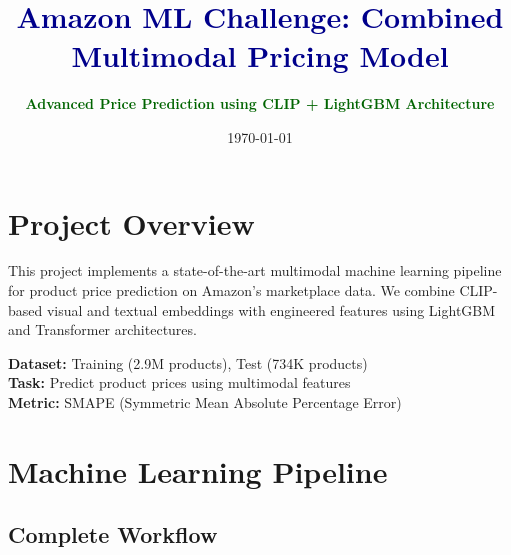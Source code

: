 \documentclass[10pt,a4paper]{article}
\title{\textcolor{darkblue}{\textbf{Amazon ML Challenge: Combined Multimodal Pricing Model}}}
\author{\textcolor{darkgreen}{\textbf{Advanced Price Prediction using CLIP + LightGBM Architecture}}}
\date{\today}
\begin{document}
\maketitle

\section{\textcolor{primarycolor}{Project Overview}}

This project implements a state-of-the-art multimodal machine learning pipeline for product price prediction on Amazon's marketplace data. We combine CLIP-based visual and textual embeddings with engineered features using LightGBM and Transformer architectures.

\textbf{Dataset:} Training (2.9M products), Test (734K products) \\
\textbf{Task:} Predict product prices using multimodal features \\
\textbf{Metric:} SMAPE (Symmetric Mean Absolute Percentage Error)

\section{\textcolor{primarycolor}{Machine Learning Pipeline}}

\subsection{Complete Workflow}
\end{document}
